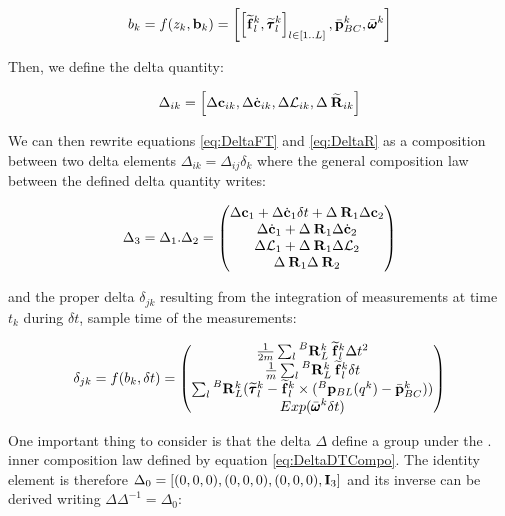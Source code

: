 \documentclass[11pt]{article}
\newcommand{\Rot}[2]{\prescript{#1}{}{\bfR}_{#2}}
\newcommand{\Rotm}[2]{\prescript{#1}{}{\widetilde{\bfR}}_{#2}}
\newcommand{\bias}{\bfb}
\newcommand{\posi}[2]{\prescript{#1}{}{\bfp}_{#2}}
\newcommand{\posibar}{\bar{\bfp}}
\newcommand{\angvelbar}{\bar{\pmb{\omega}}}
\newcommand{\forcem}[2]{\prescript{#1}{}{\widetilde{\bff}}_{#2}}
\newcommand{\torquem}[2]{\prescript{#1}{}{\widetilde{\pmb{\tau}}}_{#2}}
\newcommand{\AM}{\mathcal{L}}
\newcommand{\COM}{\bfc}
\newcommand{\COMd}{\dot{\bfc}}
\newcommand{\Ident}{\bfI}
\begin{document}
\begin{equation}
    b_k = f(z_k, \bias_k) = \left[\left[  \forcem{}{l}^k, \torquem{}{l}^k \right]_{l \in [1..L]}, \posibar_{BC}^k, \angvelbar^k \right]
\end{equation}

Then, we define the delta quantity:

\begin{equation}
    \Delta_{ik} = \left[ \Delta \COM_{ik}, \Delta \COMd_{ik}, \Delta \AM_{ik}, \Delta \Rotm{}{ik} \right]
\end{equation}

We can then rewrite equations  \ref{eq:DeltaFT} and \ref{eq:DeltaR} as a composition between two delta elements $\Delta_{ik} = \Delta_{ij} \delta_k$ where the general composition law between the defined delta quantity writes:

\begin{equation}
    \Delta_3 = \Delta_1 . \Delta_2 = 
    \begin{pmatrix}
    \Delta \COM_1 + \Delta \COMd_1 \delta t + \Delta \Rot{}{1}  \Delta \COM_2
    \\
    \Delta \COMd_1 + \Delta \Rot{}{1}  \Delta \COMd_2
    \\
    \Delta \AM_1 + \Delta \Rot{}{1}  \Delta \AM_2
    \\
    \Delta \Rot{}{1}\Delta \Rot{}{2}
    \end{pmatrix}
    \label{eq:DeltaDTCompo}
\end{equation}

and the proper delta $\delta_{jk}$ resulting from the integration of measurements at time $t_k$ during $\delta t$, sample time of the measurements:

\begin{equation}
    \delta_{jk} =
    f(b_k, \delta t) =
    \begin{pmatrix}
    \frac{1}{2m} \sum_l \Rot{B}{L}^{k} \forcem{}{l}^{k} \Delta t^2
    \\
    \frac{1}{m} \sum_l \Rot{B}{L}^{k} \forcem{}{l}^{k} \delta t 
    \\
    \sum_l \Rot{B}{L}^{k} (\torquem{}{l}^{k} - \forcem{}{l}^{k} \times (\posi{B}{BL}(q^k) - \posibar_{BC}^k))
    \\
    Exp(\angvelbar^k\delta t)
    \end{pmatrix}
\end{equation}

One important thing to consider is that the delta $\Delta$ define a group under the $.$ inner composition law defined by equation \ref{eq:DeltaDTCompo}. The identity element is therefore $\Delta_0 = \left[ (0,0,0), (0,0,0), (0,0,0), \Ident_3 \right]$ and its inverse can be derived writing $\Delta \Delta^{-1} = \Delta_0$:
\end{document}
